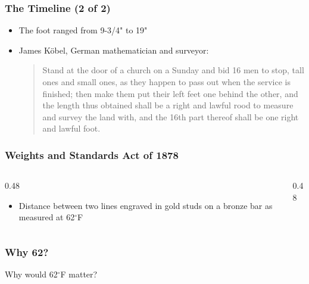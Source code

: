 \begin{frame}
	\frametitle{The Timeline (2 of 2)}
    \begin{itemize}[<+- | alert@+>]
        \item[16$^{th}$ century] The foot ranged from 9-3/4" to 19"
        \item[1535] James K\"{o}bel, German mathematician and surveyor:
        \begin{quote}
            Stand at the door of a church on a Sunday and bid 16 men to stop, tall ones and small ones, as they happen to pass out when the service is finished; then make them put their left feet one behind the other, and the length thus obtained shall be a right and lawful rood to measure and survey the land with, and the 16th part thereof shall be one right and lawful foot.
        \end{quote}
    \end{itemize}
\end{frame}

\begin{frame}
	\frametitle{Weights and Standards Act of 1878}
    \begin{columns}
        \begin{column}{0.48\linewidth}
            \begin{itemize}[<+- | alert@+>]
                \item[1 Yard] Distance between two lines engraved in gold studs on a bronze bar as measured at 62$^{\circ}$F
            \end{itemize}
        \end{column}
        \begin{column}{0.48\linewidth}
        \end{column}        
    \end{columns}
\end{frame}

\begin{frame}
    \frametitle{Why 62?}

    \centering
    Why would 62$^\circ$F matter?
\end{frame}

